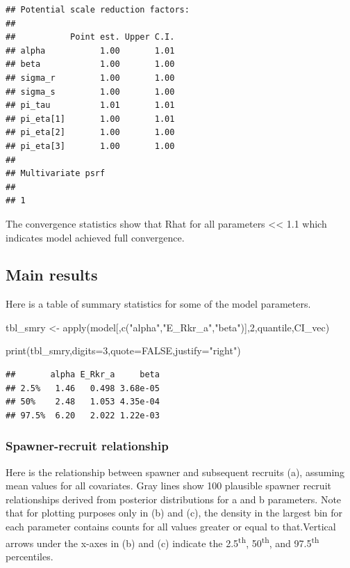 \documentclass[
  11pt,
]{article}
\newenvironment{Shaded}{}{}
\newcommand{\DataTypeTok}[1]{#1}
\newcommand{\DecValTok}[1]{#1}
\newcommand{\KeywordTok}[1]{\textcolor[rgb]{0.00,0.00,1.00}{#1}}
\newcommand{\NormalTok}[1]{#1}
\newcommand{\OtherTok}[1]{\textcolor[rgb]{1.00,0.25,0.00}{#1}}
\newcommand{\StringTok}[1]{\textcolor[rgb]{0.00,0.50,0.50}{#1}}
\begin{document}
\begin{verbatim}
## Potential scale reduction factors:
## 
##           Point est. Upper C.I.
## alpha           1.00       1.01
## beta            1.00       1.00
## sigma_r         1.00       1.00
## sigma_s         1.00       1.00
## pi_tau          1.01       1.01
## pi_eta[1]       1.00       1.01
## pi_eta[2]       1.00       1.00
## pi_eta[3]       1.00       1.00
## 
## Multivariate psrf
## 
## 1
\end{verbatim}

The convergence statistics show that Rhat for all parameters
\textless\textless{} 1.1 which indicates model achieved full
convergence.

\hypertarget{main-results}{%
\subsection{Main results}\label{main-results}}

Here is a table of summary statistics for some of the model parameters.

\begin{Shaded}
\begin{Highlighting}[]
\NormalTok{tbl_smry <-}\StringTok{ }\KeywordTok{apply}\NormalTok{(model[,}\KeywordTok{c}\NormalTok{(}\StringTok{"alpha"}\NormalTok{,}\StringTok{"E_Rkr_a"}\NormalTok{,}\StringTok{"beta"}\NormalTok{)],}\DecValTok{2}\NormalTok{,quantile,CI_vec) }
                        
                        
\KeywordTok{print}\NormalTok{(tbl_smry,}\DataTypeTok{digits=}\DecValTok{3}\NormalTok{,}\DataTypeTok{quote=}\OtherTok{FALSE}\NormalTok{,}\DataTypeTok{justify=}\StringTok{"right"}\NormalTok{)}
\end{Highlighting}
\end{Shaded}

\begin{verbatim}
##       alpha E_Rkr_a     beta
## 2.5%   1.46   0.498 3.68e-05
## 50%    2.48   1.053 4.35e-04
## 97.5%  6.20   2.022 1.22e-03
\end{verbatim}

\hypertarget{spawner-recruit-relationship}{%
\subsubsection{Spawner-recruit
relationship}\label{spawner-recruit-relationship}}

Here is the relationship between spawner and subsequent recruits (a),
assuming mean values for all covariates. Gray lines show 100 plausible
spawner recruit relationships derived from posterior distributions for a
and b parameters. Note that for plotting purposes only in (b) and (c),
the density in the largest bin for each parameter contains counts for
all values greater or equal to that.Vertical arrows under the x-axes in
(b) and (c) indicate the 2.5\textsuperscript{th},
50\textsuperscript{th}, and 97.5\textsuperscript{th} percentiles.
\end{document}
